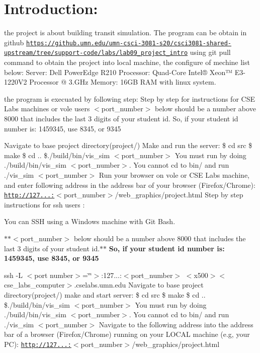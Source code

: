 \hypertarget{index_intro_sec}{}\section{Introduction\+:}\label{index_intro_sec}
the project is about building transit simulation. The program can be obtain in github \href{https://github.umn.edu/umn-csci-3081-s20/csci3081-shared-upstream/tree/support-code/labs/lab09_project_intro}{\tt https\+://github.\+umn.\+edu/umn-\/csci-\/3081-\/s20/csci3081-\/shared-\/upstream/tree/support-\/code/labs/lab09\+\_\+project\+\_\+intro} using git pull command to obtain the project into local machine, the configure of mechine list below\+: Server\+: Dell Power\+Edge R210 Processor\+: Quad-\/\+Core Intel® Xeon™ E3-\/1220\+V2 Processor @ 3.\+G\+Hz Memory\+: 16\+GB R\+AM with linux system.

the program is execuated by following step\+: Step by step for instructions for C\+SE Labs machines or vole users $<$port\+\_\+number$>$ below should be a number above 8000 that includes the last 3 digits of your student id. So, if your student id number is\+: 1459345, use 8345, or 9345

Navigate to base project directory(project/) Make and run the server\+: \$ cd src \$ make \$ cd .. \$./build/bin/vis\+\_\+sim $<$port\+\_\+number$>$ You must run by doing ./build/bin/vis\+\_\+sim $<$port\+\_\+number$>$. You cannot cd to bin/ and run ./vis\+\_\+sim $<$port\+\_\+number$>$ Run your browser on vole or C\+SE Labs machine, and enter following address in the address bar of your browser (Firefox/\+Chrome)\+: \href{http://127.0.0.1:}{\tt http\+://127...\+:}$<$port\+\_\+number$>$/web\+\_\+graphics/project.html Step by step instructions for ssh users \+:

You can S\+SH using a Windows machine with Git Bash.

$\ast$$\ast$$<$port\+\_\+number$>$ below should be a number above 8000 that includes the last 3 digits of your student id.$\ast$$\ast$ {\bfseries So, if your student id number is\+: 1459345, use 8345, or 9345}

ssh -\/L $<$port number$>$=\char`\"{}\char`\"{}$>$\+:127...\+:$<$port\+\_\+number$>$ $<$x500$>$$<$cse\+\_\+labs\+\_\+computer$>$.cselabs.\+umn.\+edu Navigate to base project directory(project/) make and start server\+: \$ cd src \$ make \$ cd .. \$./build/bin/vis\+\_\+sim $<$port\+\_\+number$>$ You must run by doing ./build/bin/vis\+\_\+sim $<$port\+\_\+number$>$. You cannot cd to bin/ and run ./vis\+\_\+sim $<$port\+\_\+number$>$ Navigate to the following address into the address bar of a browser (Firefox/\+Chrome) running on your L\+O\+C\+AL machine (e.\+g, your PC)\+: \href{http://127.0.0.1:}{\tt http\+://127...\+:}$<$port\+\_\+number$>$/web\+\_\+graphics/project.html

